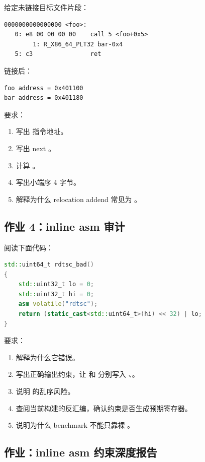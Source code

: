 \begin{exercisebox}
给定未链接目标文件片段：

\begin{lstlisting}
0000000000000000 <foo>:
   0: e8 00 00 00 00    call 5 <foo+0x5>
        1: R_X86_64_PLT32 bar-0x4
   5: c3                ret
\end{lstlisting}

链接后：

\begin{lstlisting}
foo address = 0x401100
bar address = 0x401180
\end{lstlisting}

要求：

\begin{enumerate}
  \item 写出  指令地址。
  \item 写出 next 。
  \item 计算 。
  \item 写出小端序 4 字节。
  \item 解释为什么 relocation addend 常见为 。
\end{enumerate}

\subsection*{作业 4：inline asm 审计}

阅读下面代码：

\begin{lstlisting}[language=C++]
std::uint64_t rdtsc_bad()
{
    std::uint32_t lo = 0;
    std::uint32_t hi = 0;
    asm volatile("rdtsc");
    return (static_cast<std::uint64_t>(hi) << 32) | lo;
}
\end{lstlisting}

要求：

\begin{enumerate}
  \item 解释为什么它错误。
  \item 写出正确输出约束，让  和  分别写入 、。
  \item 说明  的乱序风险。
  \item 查阅当前构建的反汇编，确认约束是否生成预期寄存器。
  \item 说明为什么 benchmark 不能只靠裸 。
\end{enumerate}

\subsection*{作业：inline asm 约束深度报告}


\end{exercisebox}
